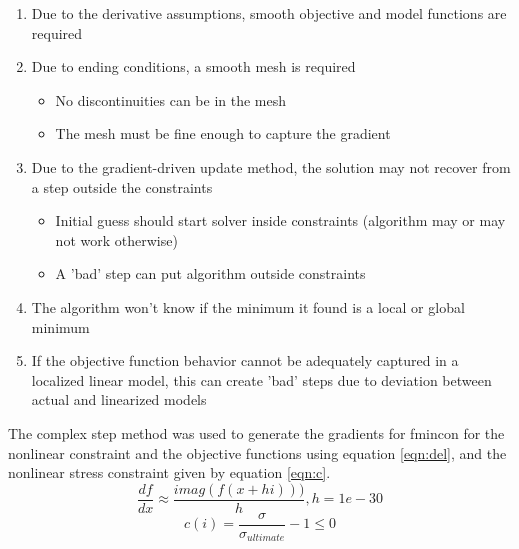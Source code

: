 \documentclass[11pt]{article}%
\begin{document}
\begin{enumerate}
	\item Due to the derivative assumptions, smooth objective  and model functions are required
	\item Due to ending conditions, a smooth mesh is required
	\begin{itemize}
		\item No discontinuities can be in the mesh
		\item The mesh must be fine enough to capture the gradient 
	\end{itemize}
	\item Due to the gradient-driven update method, the solution may not recover from a step outside the constraints
	\begin{itemize}
		\item Initial guess should start solver inside constraints (algorithm may or may not work otherwise)
		\item A 'bad' step can put algorithm outside constraints
	\end{itemize}
	\item The algorithm won't know if the minimum it found is a local or global minimum 
	\item If the objective function behavior cannot be adequately captured in a localized linear model, this can create ’bad’ steps due to deviation between actual and linearized models
\end{enumerate}

The complex step method was used to generate the gradients for fmincon for the nonlinear constraint and the objective functions using equation \ref{eqn:del}, and the nonlinear stress constraint given by equation \ref{eqn:c}.
\begin{equation}
\label{eqn:del}
\frac{df}{dx}\approx\frac{imag(f(x+hi)))}{h}, h=1e-30
\end{equation}
\begin{equation}
\label{eqn:c}
c(i)=\frac{\sigma}{\sigma_{ultimate}}-1\leq0
\end{equation}
\end{document}
